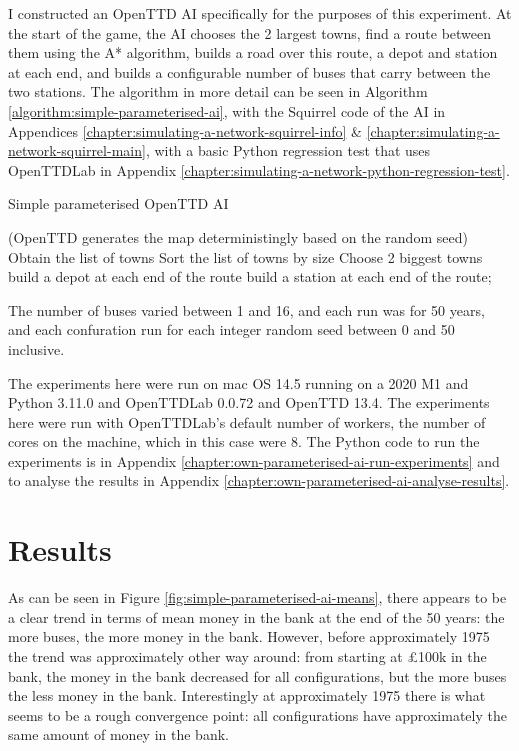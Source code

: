 \documentclass[logo,msc,dsti]{style/infthesis}    %
\begin{document}
{I constructed an OpenTTD AI specifically for the purposes of this experiment. At the start of the game, the AI chooses the 2 largest towns, find a route between them using the A* algorithm, builds a road over this route, a depot and station at each end, and builds a configurable number of buses that carry between the two stations. The algorithm in more detail can be seen in Algorithm \ref{algorithm:simple-parameterised-ai}, with the Squirrel code of the AI in Appendices \ref{chapter:simulating-a-network-squirrel-info} \& \ref{chapter:simulating-a-network-squirrel-main}, with a basic Python regression test that uses OpenTTDLab in Appendix \ref{chapter:simulating-a-network-python-regression-test}.

\begin{algorithm}
\caption{Simple parameterised OpenTTD AI}
\label{algorithm:simple-parameterised-ai}
 (OpenTTD generates the map deterministingly based on the random seed) \;
 Obtain the list of towns \;
 Sort the list of towns by size \;
 Choose 2 biggest towns \;
 build a depot at each end of the route\;
 build a station at each end of the route;
\end{algorithm}

The number of buses varied between 1 and 16, and each run was for 50 years, and each confuration run for each integer random seed between 0 and 50 inclusive.

The experiments here were run on mac OS 14.5 running on a 2020 M1 and Python
3.11.0 and OpenTTDLab 0.0.72 and OpenTTD 13.4. The experiments here were run with OpenTTDLab’s default number of
workers, the number of cores on the machine, which in this case were 8. The Python code to run the experiments is in Appendix \ref{chapter:own-parameterised-ai-run-experiments} and to analyse the results in Appendix \ref{chapter:own-parameterised-ai-analyse-results}.

\section{Results}

As can be seen in Figure \ref{fig:simple-parameterised-ai-means}, there appears to be a clear trend in terms of mean money in the bank at the end of the 50 years: the more buses, the more money in the bank. However, before approximately 1975 the trend was approximately other way around: from starting at £100k in the bank, the money in the bank decreased for all configurations, but the more buses the less money in the bank. Interestingly at approximately 1975 there is what seems to be a rough convergence point: all configurations have approximately the same amount of money in the bank.

}
\end{document}
